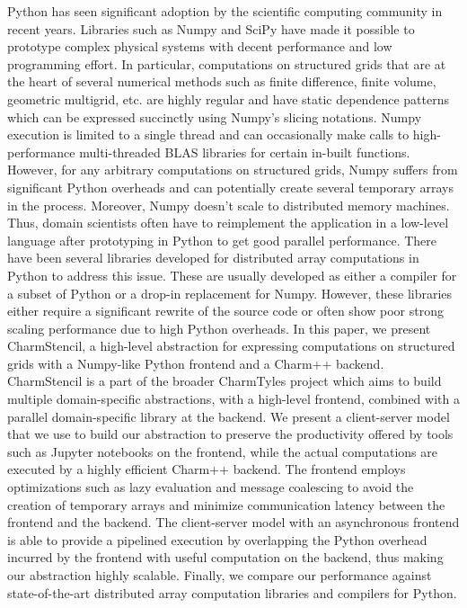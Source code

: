 Python has seen significant adoption by the scientific computing community in recent years. Libraries such as Numpy and SciPy have made it possible to prototype complex physical systems with decent performance and low programming effort. In particular, computations on structured grids that are at the heart of several numerical methods such as finite difference, finite volume, geometric multigrid, etc. are highly regular and have static dependence patterns which can be expressed succinctly using Numpy's slicing notations. Numpy execution is limited to a single thread and can occasionally make calls to high-performance multi-threaded BLAS libraries for certain in-built functions. However, for any arbitrary computations on structured grids, Numpy suffers from significant Python overheads and can potentially create several temporary arrays in the process. Moreover, Numpy doesn't scale to distributed memory machines. Thus, domain scientists often have to reimplement the application in a low-level language after prototyping in Python to get good parallel performance. There have been several libraries developed for distributed array computations in Python to address this issue. These are usually developed as either a compiler for a subset of Python or a drop-in replacement for Numpy. However, these libraries either require a significant rewrite of the source code or often show poor strong scaling performance due to high Python overheads. In this paper, we present CharmStencil, a high-level abstraction for expressing computations on structured grids with a Numpy-like Python frontend and a Charm++ backend. CharmStencil is a part of the broader CharmTyles project which aims to build multiple domain-specific abstractions, with a high-level frontend, combined with a parallel domain-specific library at the backend. We present a client-server model that we use to build our abstraction to preserve the productivity offered by tools such as Jupyter notebooks on the frontend, while the actual computations are executed by a highly efficient Charm++ backend. The frontend employs optimizations such as lazy evaluation and message coalescing to avoid the creation of temporary arrays and minimize communication latency between the frontend and the backend. The client-server model with an asynchronous frontend is able to provide a pipelined execution by overlapping the Python overhead incurred by the frontend with useful computation on the backend, thus making our abstraction highly scalable. Finally, we compare our performance against state-of-the-art distributed array computation libraries and compilers for Python.
